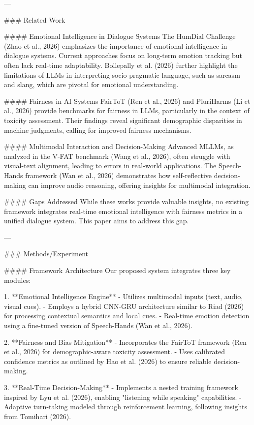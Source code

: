---

### Related Work  

#### Emotional Intelligence in Dialogue Systems  
The HumDial Challenge (Zhao et al., 2026) emphasizes the importance of emotional intelligence in dialogue systems. Current approaches focus on long-term emotion tracking but often lack real-time adaptability. Bollepally et al. (2026) further highlight the limitations of LLMs in interpreting socio-pragmatic language, such as sarcasm and slang, which are pivotal for emotional understanding.

#### Fairness in AI Systems  
FairToT (Ren et al., 2026) and PluriHarms (Li et al., 2026) provide benchmarks for fairness in LLMs, particularly in the context of toxicity assessment. Their findings reveal significant demographic disparities in machine judgments, calling for improved fairness mechanisms.

#### Multimodal Interaction and Decision-Making  
Advanced MLLMs, as analyzed in the V-FAT benchmark (Wang et al., 2026), often struggle with visual-text alignment, leading to errors in real-world applications. The Speech-Hands framework (Wan et al., 2026) demonstrates how self-reflective decision-making can improve audio reasoning, offering insights for multimodal integration.

#### Gaps Addressed  
While these works provide valuable insights, no existing framework integrates real-time emotional intelligence with fairness metrics in a unified dialogue system. This paper aims to address this gap.

---

### Methods/Experiment  

#### Framework Architecture  
Our proposed system integrates three key modules:  

1. **Emotional Intelligence Engine**  
   - Utilizes multimodal inputs (text, audio, visual cues).
   - Employs a hybrid CNN-GRU architecture similar to Riad (2026) for processing contextual semantics and local cues.
   - Real-time emotion detection using a fine-tuned version of Speech-Hands (Wan et al., 2026).

2. **Fairness and Bias Mitigation**  
   - Incorporates the FairToT framework (Ren et al., 2026) for demographic-aware toxicity assessment.
   - Uses calibrated confidence metrics as outlined by Hao et al. (2026) to ensure reliable decision-making.

3. **Real-Time Decision-Making**  
   - Implements a nested training framework inspired by Lyu et al. (2026), enabling "listening while speaking" capabilities.
   - Adaptive turn-taking modeled through reinforcement learning, following insights from Tomihari (2026).

